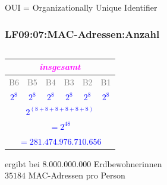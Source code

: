 \begin{frame}
\vspace{0.4cm}
\begin{flushright}
\begin{tiny}
OUI = Organizationally Unique Identifier
\end{tiny}
\end{flushright}

\end{frame}


\begin{frame}  
  \frametitle{LF09:07:MAC-Adressen:Anzahl}
  \begin{footnotesize}
  
  
  \begin{columns}[t]

  \begin{center}

    \renewcommand{\arraystretch}{1.5}
    \begin{tabular}{| c | c | c || c | c | c |}
      \hline
      \multicolumn{6}{|c|}{\tiny{\textit{\textrm{\textcolor{magenta}{insgesamt}}}}} \\
      \hline
      \textcolor{gray}{\tiny{B6}} & \textcolor{gray}{\tiny{B5}} 
        & \textcolor{gray}{\tiny{B4}} & \textcolor{gray}{\tiny{B3}} 
          & \textcolor{gray}{\tiny{B2}} & \textcolor{gray}{\tiny{B1}}  \\
      \hline
      \textcolor{blue}{\texttt{$2^8$}} & \textcolor{blue}{\texttt{$2^8$}} 
        & \textcolor{blue}{\texttt{$2^8$}} & \textcolor{blue}{\texttt{$2^8$}} 
          & \textcolor{blue}{\texttt{$2^8$}} & \textcolor{blue}{\texttt{$2^8$}} \\
      \hline
      \hline
      \multicolumn{6}{|c|}{\textcolor{blue}{\texttt{$2^{(8 + 8 + 8 + 8 + 8 + 8)}$}}} \\
      \hline
      \multicolumn{6}{|c|}{\textcolor{blue}{\texttt{$= 2^{48}$}}} \\
      \hline
      \multicolumn{6}{|c|}{\textcolor{blue}{\texttt{$= 281.474.976.710.656$}}}\\
      \hline
    \end{tabular}

  \vspace{0.4cm}
  \begin{tiny}
  ergibt bei $8.000.000.000$ Erdbewohnerinnen \\$35184$ MAC-Adressen pro Person
  \end{tiny}
  \end{center}  


\end{columns}
\end{footnotesize}
\end{frame}

